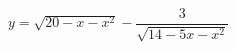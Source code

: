 \begin{ex}
	\begin{condition}
		\( y=\sqrt{20-x-x^2}-\dfrac{3}{\sqrt{14-5x-x^2}} \)
	\end{condition}
\end{ex}